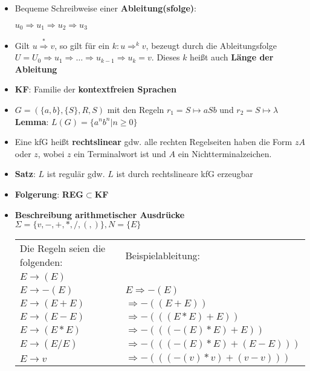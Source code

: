 \documentclass[12pt, a4paper]{article}
\begin{document}
\begin{itemize}
		\item Bequeme Schreibweise einer \textbf{Ableitung(sfolge)}:
			\begin{center} $u_{0}\Rightarrow u_{1}\Rightarrow u_{2}\Rightarrow u_{3}$ \end{center}
		
		\item Gilt $u\stackrel{*}{\Rightarrow}v$, so gilt für ein $k:u\Rightarrow^{k}v$, bezeugt durch die Ableitungsfolge $U=U_{0}\Rightarrow u_{1}\Rightarrow\dots\Rightarrow u_{k-1}\Rightarrow u_{k}=v$. Dieses $k$ heißt auch \textbf{Länge der Ableitung}
		
		\item \textbf{KF}: Familie der \textbf{kontextfreien Sprachen}
		
		\item $G = (\{a,b\},\{S\},R,S)$ mit den Regeln $r_{1}=S\mapsto aSb$ und $r_{2}=S\mapsto\lambda$
			\subitem\textbf{Lemma}: $L(G)=\{a^{n}b^{n}|n\geq0\}$
		
		\item Eine kfG heißt \textbf{rechtslinear} gdw. alle rechten Regelseiten haben die Form $zA$ oder $z$, wobei $z$ ein Terminalwort ist und $A$ ein Nichtterminalzeichen.
		
		\item \textbf{Satz}: $L$ ist regulär gdw. $L$ ist durch rechtslineare kfG erzeugbar
		
		\item \textbf{Folgerung}: \textbf{REG}$\subset$\textbf{KF}
		
		\item \textbf{Beschreibung arithmetischer Ausdrücke}
			\subitem $\Sigma=\{v,-,+,\ast,/,(,)\},N=\{E\}$
			\subitem \begin{tabular}{ll}
				Die Regeln seien die folgenden:	&	Beispielableitung:	\\
				$E\rightarrow (E)$	&	\\
				$E\rightarrow -(E)$	&	$E\Rightarrow -(E)$	\\
				$E\rightarrow (E + E)$	&	$\Rightarrow -((E + E))$	\\
				$E\rightarrow (E - E)$	&	$\Rightarrow -(((E\ast E) + E))$	\\
				$E\rightarrow (E\ast E)$	&	$\Rightarrow -(((-(E)\ast E) + E))$	\\
				$E\rightarrow (E/E)$	&	$\Rightarrow -(((-(E)\ast E) + (E - E)))$	\\
				$E\rightarrow v$	&	$\Rightarrow -(((-(v)\ast v) + (v - v)))$	\\
			\end{tabular}
		

\end{itemize}
\end{document}
